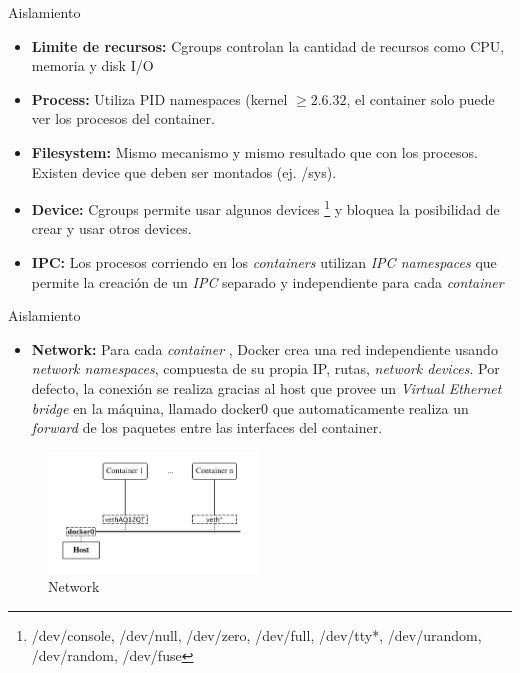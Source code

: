 \documentclass{bredelebeamer}
\newcommand{\container}{\textit{container }}
\newcommand{\containers}{\textit{containers }}
\begin{document}
\begin{frame}{Aislamiento}
	\begin{itemize}
		\item \textbf{Limite de recursos:}  Cgroups controlan la cantidad de recursos como CPU, memoria y disk I/O 
		\item \textbf{Process:} Utiliza PID namespaces (kernel \(\geq 2.6.32\), el container solo puede ver los procesos del container.
		\item \textbf{Filesystem:} Mismo mecanismo y mismo resultado que con los procesos. Existen device que deben ser montados (ej. /sys).
		\item \textbf{Device:} Cgroups permite usar algunos devices \footnote{/dev/console, /dev/null, /dev/zero, /dev/full, /dev/tty*, /dev/urandom, /dev/random, /dev/fuse} y bloquea la posibilidad de crear y usar otros devices.
		\item \textbf{IPC:} Los procesos corriendo en los \containers utilizan \textit{IPC namespaces} que permite la creación de un \textit{IPC} separado y independiente para cada \container 

	\end{itemize}
\end{frame}

\begin{frame}{Aislamiento}
	\begin{itemize}
	
		\item \textbf{Network:}
		Para cada \container, Docker crea una red independiente usando \emph{network namespaces}, compuesta de su propia IP, rutas, \emph{network devices}.
		Por defecto, la conexión se realiza gracias al host que provee un \emph{Virtual Ethernet bridge} en la máquina, llamado docker0 que automaticamente realiza un \emph{forward} de los paquetes entre las interfaces del container.
	\end{itemize}
	
	\begin{figure}[H]
  \centering
  \includegraphics[width=0.5\textwidth]{images/network.png}
    \caption{Network}
    \label{fig:dynamic}
\end{figure}	
\end{frame}
\end{document}
